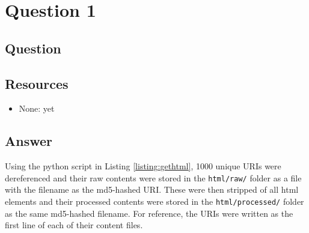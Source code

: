 \section{Question 1}

\subsection{Question}


\subsection{Resources}
\begin{itemize}
\item None: yet
\end{itemize}

\subsection{Answer}
Using the python script in Listing \ref{listing:gethtml}, 1000 unique URIs were dereferenced and
their raw contents were stored in the {\tt html/raw/} folder as a file with the filename as the
md5-hashed URI. These were then stripped of all html elements and their processed contents were 
stored in the {\tt html/processed/} folder as the same md5-hashed filename. For reference, the URIs were written as the first line of each of their content files.

%